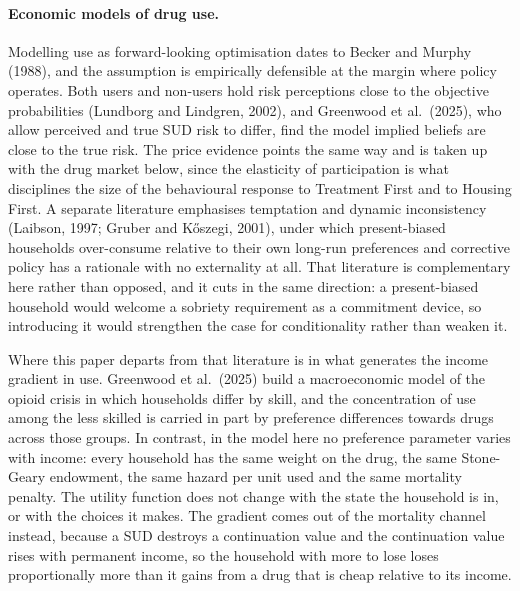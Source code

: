 \documentclass[10pt]{article}
\begin{document}
\paragraph{Economic models of drug use.} Modelling use as forward-looking
optimisation dates to Becker and Murphy (1988), and the assumption is empirically
defensible at the margin where policy operates. Both users and non-users hold risk
perceptions close to the objective probabilities (Lundborg and Lindgren, 2002), and
Greenwood et al.\ (2025), who allow perceived and true SUD risk to
differ, find the model implied beliefs are close to the true risk. The price evidence points
the same way and is taken up with the drug market below, since the elasticity of
participation is what disciplines the size of the behavioural response to Treatment
First and to Housing First. A separate literature emphasises temptation and dynamic
inconsistency (Laibson, 1997; Gruber and K\H{o}szegi, 2001), under which
present-biased households over-consume relative to their own long-run preferences
and corrective policy has a rationale with no externality at all. That literature is
complementary here rather than opposed, and it cuts in the same direction: a
present-biased household would welcome a sobriety requirement as a commitment
device, so introducing it would strengthen the case for conditionality rather than
weaken it.

Where this paper departs from that literature is in what generates the income gradient
in use. Greenwood et al.\ (2025) build a macroeconomic model of the opioid crisis in
which households differ by skill, and the concentration of use among the less skilled
is carried in part by preference differences towards drugs across those groups. In contrast, in the
model here no preference parameter varies with income: every household has the same
weight on the drug, the same Stone-Geary endowment, the same hazard per unit used and
the same mortality penalty. The utility function does not change with the state the
household is in, or with the choices it makes. The gradient comes out of the mortality
channel instead, because a SUD destroys a continuation value and the continuation
value rises with permanent income, so the household with more to lose loses
proportionally more than it gains from a drug that is cheap relative to its income.
\end{document}
